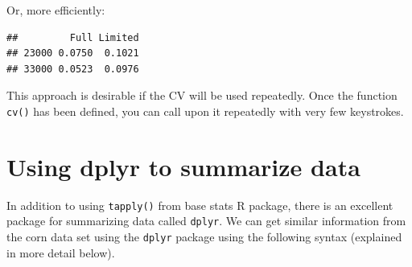 \documentclass[letterpaper,]{book}
\newenvironment{Shaded}{\begin{snugshade}}{\end{snugshade}}
\newcommand{\ControlFlowTok}[1]{\textcolor[rgb]{0.13,0.29,0.53}{\textbf{#1}}}
\newcommand{\DataTypeTok}[1]{\textcolor[rgb]{0.13,0.29,0.53}{#1}}
\newcommand{\DecValTok}[1]{\textcolor[rgb]{0.00,0.00,0.81}{#1}}
\newcommand{\KeywordTok}[1]{\textcolor[rgb]{0.13,0.29,0.53}{\textbf{#1}}}
\newcommand{\NormalTok}[1]{#1}
\newcommand{\OperatorTok}[1]{\textcolor[rgb]{0.81,0.36,0.00}{\textbf{#1}}}
\newcommand{\StringTok}[1]{\textcolor[rgb]{0.31,0.60,0.02}{#1}}
\begin{document}
Or, more efficiently:

\begin{Shaded}
\end{Shaded}

\begin{verbatim}
##         Full Limited
## 23000 0.0750  0.1021
## 33000 0.0523  0.0976
\end{verbatim}

This approach is desirable if the CV will be used repeatedly. Once the function \texttt{cv()} has been defined, you can call upon it repeatedly with very few keystrokes.

\hypertarget{using-dplyr-to-summarize-data}{%
\section{Using dplyr to summarize data}\label{using-dplyr-to-summarize-data}}

In addition to using \texttt{tapply()} from base stats R package, there is an excellent package for summarizing data called \texttt{dplyr}. We can get similar information from the corn data set using the \texttt{dplyr} package using the following syntax (explained in more detail below).

\begin{Shaded}
\end{Shaded}
\end{document}
